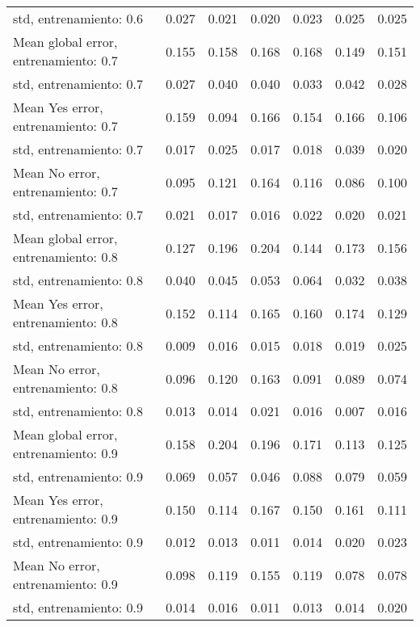 \begin{longtable}{p{4cm}|p{1.5cm}|p{1.5cm}|p{1.5cm}|p{1.5cm}|p{1.5cm}|p{1.5cm}}
std, entrenamiento: 0.6               & 0.027 & 0.021 &        0.020 &     0.023 &     0.025 & 0.025 \\
Mean global error, entrenamiento: 0.7 & 0.155 & 0.158 &        0.168 &     0.168 &     0.149 & 0.151 \\
std, entrenamiento: 0.7               & 0.027 & 0.040 &        0.040 &     0.033 &     0.042 & 0.028 \\
Mean Yes error, entrenamiento: 0.7    & 0.159 & 0.094 &        0.166 &     0.154 &     0.166 & 0.106 \\
std, entrenamiento: 0.7               & 0.017 & 0.025 &        0.017 &     0.018 &     0.039 & 0.020 \\
Mean No error, entrenamiento: 0.7     & 0.095 & 0.121 &        0.164 &     0.116 &     0.086 & 0.100 \\
std, entrenamiento: 0.7               & 0.021 & 0.017 &        0.016 &     0.022 &     0.020 & 0.021 \\
Mean global error, entrenamiento: 0.8 & 0.127 & 0.196 &        0.204 &     0.144 &     0.173 & 0.156 \\
std, entrenamiento: 0.8               & 0.040 & 0.045 &        0.053 &     0.064 &     0.032 & 0.038 \\
Mean Yes error, entrenamiento: 0.8    & 0.152 & 0.114 &        0.165 &     0.160 &     0.174 & 0.129 \\
std, entrenamiento: 0.8               & 0.009 & 0.016 &        0.015 &     0.018 &     0.019 & 0.025 \\
Mean No error, entrenamiento: 0.8     & 0.096 & 0.120 &        0.163 &     0.091 &     0.089 & 0.074 \\
std, entrenamiento: 0.8               & 0.013 & 0.014 &        0.021 &     0.016 &     0.007 & 0.016 \\
Mean global error, entrenamiento: 0.9 & 0.158 & 0.204 &        0.196 &     0.171 &     0.113 & 0.125 \\
std, entrenamiento: 0.9               & 0.069 & 0.057 &        0.046 &     0.088 &     0.079 & 0.059 \\
Mean Yes error, entrenamiento: 0.9    & 0.150 & 0.114 &        0.167 &     0.150 &     0.161 & 0.111 \\
std, entrenamiento: 0.9               & 0.012 & 0.013 &        0.011 &     0.014 &     0.020 & 0.023 \\
Mean No error, entrenamiento: 0.9     & 0.098 & 0.119 &        0.155 &     0.119 &     0.078 & 0.078 \\
std, entrenamiento: 0.9               & 0.014 & 0.016 &        0.011 &     0.013 &     0.014 & 0.020 \\

\end{longtable}
